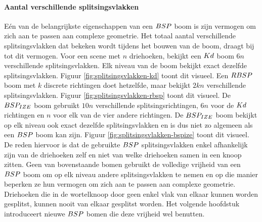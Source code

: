   \paragraph{Aantal verschillende splitsingsvlakken}
  Eén van de belangrijkste eigenschappen van een $BSP$ boom is zijn vermogen om zich aan te passen aan complexe geometrie.
  Het totaal aantal verschillende splitsingsvlakken dat bekeken wordt tijdens het bouwen van de boom, draagt bij tot dit vermogen.
  Voor een scene met $n$ driehoeken, bekijkt een $Kd$ boom $6n$ verschillende splitsingsvlakken. 
  Elk niveau van de boom bekijkt exact dezelfde splitsingsvlakken. Figuur \ref{fig:splitsingsvlakken-kd} toont dit visueel.
  Een $RBSP$ boom met $k$ discrete richtingen doet hetzelfde, maar bekijkt $2kn$ verschillende splitsingsvlakken. 
  Figuur \ref{fig:splitsingsvlakken-rbsp} toont dit visueel.
  De $BSP_{IZE}$ boom gebruikt $10n$ verschillende splitsingsrichtingen, $6n$ voor de $Kd$ richtingen en $n$ voor elk van de vier andere richtingen.
  De $BSP_{IZE}$ boom bekijkt op elk niveau ook exact dezelfde splitsingsvlakken en is dus niet zo algemeen als een $BSP$ boom kan zijn. 
  Figuur \ref{fig:splitsingsvlakken-bspize} toont dit visueel.
  De reden hiervoor is dat de gebruikte $BSP$ splitsingsvlakken enkel afhankelijk zijn van de driehoeken zelf en niet van welke driehoeken samen in een knoop zitten.
  Geen van bovenstaande bomen gebruikt de volledige vrijheid van een $BSP$ boom om op elk niveau andere splitsingsvlakken te nemen en op die manier beperken ze hun vermogen om zich aan te passen aan complexe geometrie.
  Driehoeken die in de wortelknoop door geen enkel vlak van elkaar kunnen worden gesplitst, kunnen nooit van elkaar gesplitst worden.
  Het volgende hoofdstuk introduceert nieuwe $BSP$ bomen die deze vrijheid wel benutten.


